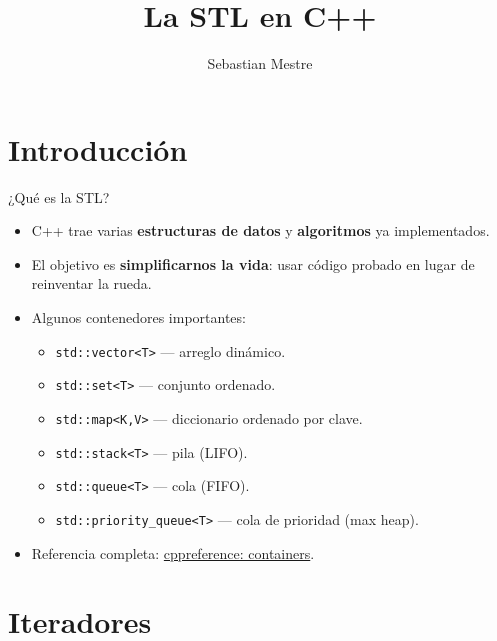 \documentclass[aspectratio=169]{beamer}
\title{La STL en C++}
\author{Sebastian Mestre}
\date{}
\begin{document}
\begin{frame}
  \titlepage
\end{frame}

\section{Introducción}

\begin{frame}{¿Qué es la STL?}
  \begin{itemize}
    \item C++ trae varias \textbf{estructuras de datos} y \textbf{algoritmos} ya implementados.
    \item El objetivo es \textbf{simplificarnos la vida}: usar código probado en lugar de reinventar la rueda.
    \item Algunos contenedores importantes:
      \begin{itemize}
        \item \texttt{std::vector<T>} — arreglo dinámico.
        \item \texttt{std::set<T>} — conjunto ordenado.
        \item \texttt{std::map<K,V>} — diccionario ordenado por clave.
        \item \texttt{std::stack<T>} — pila (LIFO).
        \item \texttt{std::queue<T>} — cola (FIFO).
        \item \texttt{std::priority\_queue<T>} — cola de prioridad (max heap).
      \end{itemize}
    \item Referencia completa: \href{https://en.cppreference.com/w/cpp/container}{cppreference: containers}.
  \end{itemize}
\end{frame}

\section{Iteradores}
\end{document}
